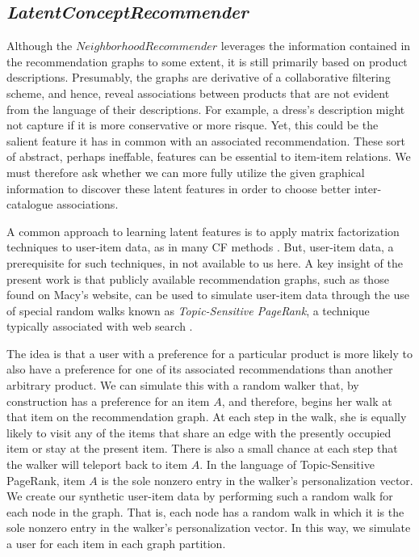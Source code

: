 \documentclass[11pt]{article}
\begin{document}
\subsection*{\em LatentConceptRecommender}
Although the $NeighborhoodRecommender$ leverages the information contained in
the recommendation graphs to some extent, it is still primarily based on product
descriptions. Presumably, the graphs are derivative of a collaborative filtering
scheme, and hence, reveal associations between products that are not evident
from the language of their descriptions. For example, a dress's description
might not capture if it is more conservative or more risque. Yet, this could be
the salient feature it has in common with an associated recommendation.  These
sort of abstract, perhaps ineffable, features can be essential to item-item
relations. We must therefore ask whether we can more fully utilize the given
graphical information to discover these latent features in order to choose
better inter-catalogue associations.

A common approach to learning latent features is to apply matrix factorization
techniques to user-item data, as in many CF methods \cite{Koren2009}. But,
user-item data, a prerequisite for such techniques, in not available to us here.
A key insight of the present work is that publicly available recommendation
graphs, such as those found on Macy's website, can be used to simulate user-item
data through the use of special random walks known as {\em Topic-Sensitive
PageRank}, a technique typically associated with web search
\cite{Haveliwala2002}.

The idea is that a user with a preference for a particular product is more
likely to also have a preference for one of its associated recommendations than
another arbitrary product. We can simulate this with a random walker that, by
construction has a preference for an item $A$, and therefore, begins her walk at
that item on the recommendation graph. At each step in the walk, she is equally
likely to visit any of the items that share an edge with the presently occupied
item or stay at the present item. There is also a small chance at each step that
the walker will teleport back to item $A$. In the language of Topic-Sensitive
PageRank, item $A$ is the sole nonzero entry in the walker's personalization
vector. We create our synthetic user-item data by performing such a random walk
for each node in the graph. That is, each node has a random walk in which it is
the sole nonzero entry in the walker's personalization vector. In this way, we
simulate a user for each item in each graph partition.
\end{document}
